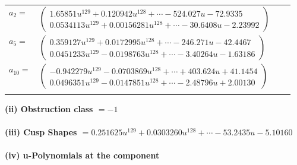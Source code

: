 \documentclass[1p]{elsarticle_modified}
\theoremstyle{definition}
\begin{document}
\begin{tabular}{m{7pt} m{180pt} m{7pt} m{180pt} }
\flushright $a_{2}=$&$\begin{pmatrix}1.65851 u^{129}+0.120942 u^{128}+\cdots-524.027 u-72.9335\\0.0534113 u^{129}+0.00156281 u^{128}+\cdots-30.6408 u-2.23992\end{pmatrix}$ \\
\flushright $a_{5}=$&$\begin{pmatrix}0.359127 u^{129}+0.0172995 u^{128}+\cdots-246.271 u-42.4467\\0.0451233 u^{129}-0.0198763 u^{128}+\cdots-3.40264 u-1.63186\end{pmatrix}$ \\
\flushright $a_{10}=$&$\begin{pmatrix}-0.942279 u^{129}-0.0703869 u^{128}+\cdots+403.624 u+41.1454\\0.0496351 u^{129}-0.0147851 u^{128}+\cdots-2.48796 u+2.00130\end{pmatrix}$\\&\end{tabular}
\flushleft \textbf{(ii) Obstruction class $= -1$}\\~\\
\flushleft \textbf{(iii) Cusp Shapes $= 0.251625 u^{129}+0.0303260 u^{128}+\cdots-53.2435 u-5.10160$}\\~\\
\newpage\renewcommand{\arraystretch}{1}
\flushleft \textbf{(iv) u-Polynomials at the component}\newline \\
\end{document}
